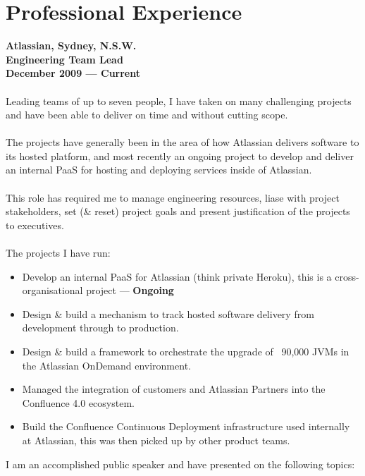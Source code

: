 \documentclass[a4paper]{article}
\begin{document}
\section*{Professional Experience}
\textbf{Atlassian, Sydney, N.S.W.\\Engineering Team Lead\\December 2009 --- Current}\\\\
Leading teams of up to seven people, I have taken on many challenging projects and have been able to deliver on time and without cutting scope.
\\\\The projects have generally been in the area of how Atlassian delivers software to its hosted platform, and most recently an ongoing project to develop and deliver an internal PaaS for hosting and deploying services inside of Atlassian.
\\\\
This role has required me to manage engineering resources, liase with project stakeholders, set (\& reset) project goals and present justification of the projects to executives.
\\\\
The projects I have run:
\begin{itemize}
\item Develop an internal PaaS for Atlassian (think private Heroku), this is a cross-organisational project --- \textbf{Ongoing}
\item Design \& build a mechanism to track hosted software delivery from development through to production.
\item Design \& build a framework to orchestrate the upgrade of ~90,000 JVMs in the Atlassian OnDemand environment.
\item Managed the integration of customers and Atlassian Partners into the Confluence 4.0 ecosystem.
\item Build the Confluence Continuous Deployment infrastructure used internally at Atlassian, this was then picked up by other product teams.
\end{itemize}
I am an accomplished public speaker and have presented on the following topics:
\end{document}
